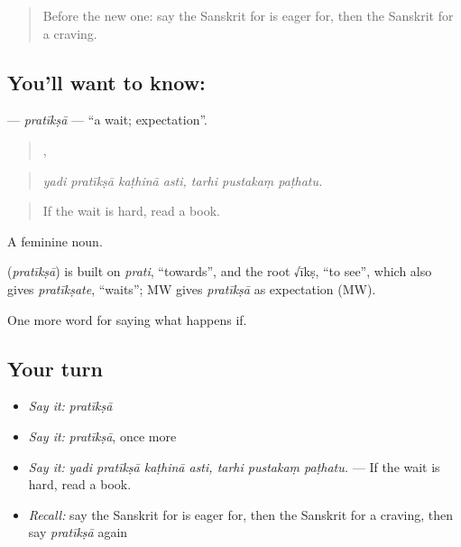 \label{lesson:SA-C549-pratiksa}



\begin{quote}
Before the new one: say the Sanskrit for is eager for, then the Sanskrit for a craving.
\end{quote}

\subsection*{You'll want to know: }
\textbf{} — \emph{pratīkṣā} — \textquotedblleft{}a wait; expectation\textquotedblright{}.

\begin{quote}
   ,   
\end{quote}

\begin{quote}
\emph{yadi pratīkṣā kaṭhinā asti, tarhi pustakaṃ paṭhatu.}
\end{quote}

\begin{quote}
If the wait is hard, read a book.
\end{quote}

A feminine noun.

\begin{cousinweb}
\textbf{} (\emph{pratīkṣā}) is built on \emph{prati}, \textquotedblleft{}towards\textquotedblright{}, and the root √īkṣ, \textquotedblleft{}to see\textquotedblright{}, which also gives \emph{pratīkṣate}, \textquotedblleft{}waits\textquotedblright{}; MW gives \emph{pratīkṣā} as expectation (MW).
\end{cousinweb}

\begin{grammarlens}[title={What you've built}]
One more word for saying what happens if.
\end{grammarlens}

\subsection*{Your turn}
\begin{itemize}
\raggedright
  \item \emph{Say it:} \emph{pratīkṣā}
  \item \emph{Say it:} \emph{pratīkṣā}, once more
  \item \emph{Say it:} \emph{yadi pratīkṣā kaṭhinā asti, tarhi pustakaṃ paṭhatu.} — If the wait is hard, read a book.
  \item \emph{Recall:} say the Sanskrit for is eager for, then the Sanskrit for a craving, then say \emph{pratīkṣā} again
\end{itemize}

